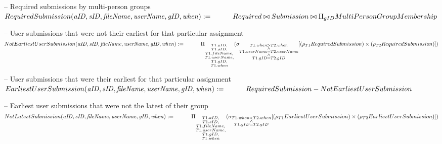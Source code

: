 \documentclass{article}
\newcommand{\var}[1]{\mathit{#1}}
\begin{document}
\begin{enumerate}
{-- Required submissions by multi-person groups \\[5pt]
$
RequiredSubmission(\var{aID, sID, fileName, userName, gID, when}) := \\[5pt]
    \hspace*{1cm}
	Required \bowtie Submission \bowtie \Pi_{gID}MultiPersonGroupMembership \\[10pt]
$

-- User submissions that were not their earliest for that particular assignment \\[5pt]
$
NotEarliestUserSubmission(\var{aID, sID, fileName, userName, gID, when}) := \\[5pt]
    \hspace*{1cm}
	\Pi_{\substack{T1.aID, \\ T1.sID, \\ T1.fileName, \\ T1.userName, \\ T1.gID, \\ T1.when}}
	(\sigma_{\substack{T1.when > T2.when \\ \wedge \\ T1.userName = T2.userName \\ \wedge \\ T1.gID = T2.gID}} 
	[(\rho_{T1}RequiredSubmission) \times (\rho_{T2}RequiredSubmission)]) \\[10pt]
$

-- User submissions that were their earliest for that particular assignment \\[5pt]
$
EarliestUserSubmission(\var{aID, sID, fileName, userName, gID, when}) := \\[5pt]
    \hspace*{1cm}
	RequiredSubmission - NotEarliestUserSubmission \\[10pt]
$

-- Earliest user submissions that were not the latest of their group \\[5pt]
$
NotLatestSubmission(\var{aID, sID, fileName, userName, gID, when}) := \\[5pt]
    \hspace*{1cm}
	\Pi_{\substack{T1.aID, \\ T1.sID, \\ T1.fileName, \\ T1.userName, \\ T1.gID, \\ T1.when}}
	(\sigma_{\substack{T1.when < T2.when \\ \wedge \\ T1.gID = T2.gID}} 
	[(\rho_{T1}EarliestUserSubmission) \times (\rho_{T2}EarliestUserSubmission)]) \\[10pt]
$

}
\end{enumerate}
\end{document}
